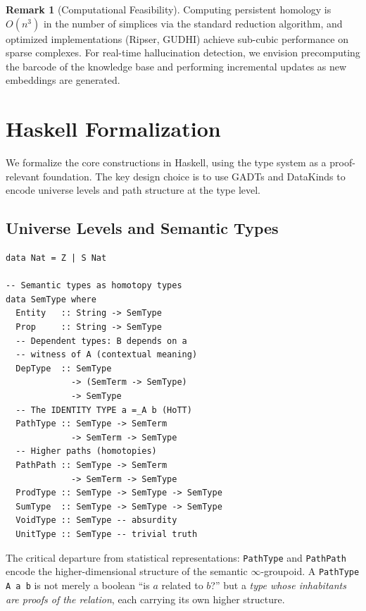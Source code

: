\documentclass[11pt,a4paper,twocolumn]{article}
\theoremstyle{plain}
\theoremstyle{definition}
\newtheorem{remark}[theorem]{Remark}
\begin{document}
\begin{remark}[Computational Feasibility]
Computing persistent homology is $O(n^3)$ in the number of simplices via the standard reduction algorithm, and optimized implementations (Ripser, GUDHI) achieve sub-cubic performance on sparse complexes. For real-time hallucination detection, we envision precomputing the barcode of the knowledge base and performing incremental updates as new embeddings are generated.
\end{remark}

\section{Haskell Formalization}\label{sec:haskell}

We formalize the core constructions in Haskell, using the type system as a proof-relevant foundation. The key design choice is to use GADTs and DataKinds to encode universe levels and path structure at the type level.

\subsection{Universe Levels and Semantic Types}

\begin{lstlisting}
data Nat = Z | S Nat

-- Semantic types as homotopy types
data SemType where
  Entity   :: String -> SemType
  Prop     :: String -> SemType
  -- Dependent types: B depends on a
  -- witness of A (contextual meaning)
  DepType  :: SemType
             -> (SemTerm -> SemType)
             -> SemType
  -- The IDENTITY TYPE a =_A b (HoTT)
  PathType :: SemType -> SemTerm
             -> SemTerm -> SemType
  -- Higher paths (homotopies)
  PathPath :: SemType -> SemTerm
             -> SemTerm -> SemType
  ProdType :: SemType -> SemType -> SemType
  SumType  :: SemType -> SemType -> SemType
  VoidType :: SemType -- absurdity
  UnitType :: SemType -- trivial truth
\end{lstlisting}

The critical departure from statistical representations: \texttt{PathType} and \texttt{PathPath} encode the higher-dimensional structure of the semantic $\infty$-groupoid. A \texttt{PathType A a b} is not merely a boolean ``is $a$ related to $b$?'' but a \emph{type whose inhabitants are proofs of the relation}, each carrying its own higher structure.
\end{document}
